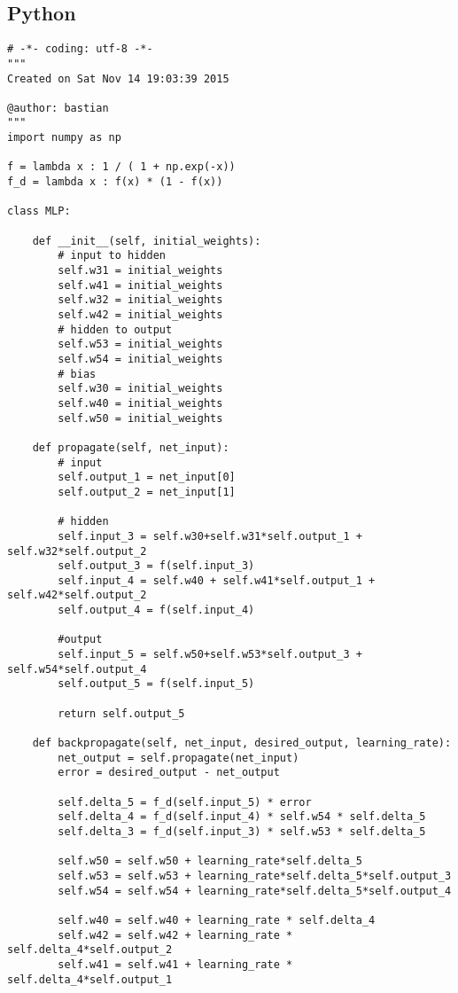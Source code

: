 \documentclass[paper=a4, fontsize=11pt]{scrartcl} %
\numberwithin{equation}{section} %
\numberwithin{figure}{section} %
\numberwithin{table}{section} %
\begin{document}
\subsection{Python}
\begin{lstlisting}
# -*- coding: utf-8 -*-
"""
Created on Sat Nov 14 19:03:39 2015

@author: bastian
"""
import numpy as np

f = lambda x : 1 / ( 1 + np.exp(-x))
f_d = lambda x : f(x) * (1 - f(x))

class MLP:
    
    def __init__(self, initial_weights):
        # input to hidden
        self.w31 = initial_weights
        self.w41 = initial_weights
        self.w32 = initial_weights
        self.w42 = initial_weights
        # hidden to output
        self.w53 = initial_weights
        self.w54 = initial_weights
        # bias
        self.w30 = initial_weights
        self.w40 = initial_weights
        self.w50 = initial_weights
    
    def propagate(self, net_input):
        # input
        self.output_1 = net_input[0]
        self.output_2 = net_input[1]
        
        # hidden
        self.input_3 = self.w30+self.w31*self.output_1 + self.w32*self.output_2
        self.output_3 = f(self.input_3)
        self.input_4 = self.w40 + self.w41*self.output_1 + self.w42*self.output_2
        self.output_4 = f(self.input_4)
        
        #output
        self.input_5 = self.w50+self.w53*self.output_3 + self.w54*self.output_4
        self.output_5 = f(self.input_5)
        
        return self.output_5
        
    def backpropagate(self, net_input, desired_output, learning_rate):
        net_output = self.propagate(net_input)
        error = desired_output - net_output
        
        self.delta_5 = f_d(self.input_5) * error
        self.delta_4 = f_d(self.input_4) * self.w54 * self.delta_5
        self.delta_3 = f_d(self.input_3) * self.w53 * self.delta_5

        self.w50 = self.w50 + learning_rate*self.delta_5
        self.w53 = self.w53 + learning_rate*self.delta_5*self.output_3
        self.w54 = self.w54 + learning_rate*self.delta_5*self.output_4
        
        self.w40 = self.w40 + learning_rate * self.delta_4
        self.w42 = self.w42 + learning_rate * self.delta_4*self.output_2
        self.w41 = self.w41 + learning_rate * self.delta_4*self.output_1
        

\end{lstlisting}
\end{document}
